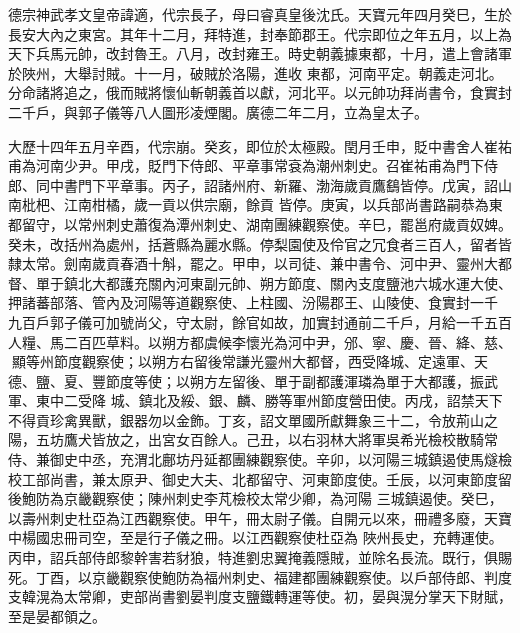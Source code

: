 
\begin{pinyinscope}

 德宗神武孝文皇帝諱適，代宗長子，母曰睿真皇後沈氏。天寶元年四月癸巳，生於長安大內之東宮。其年十二月，拜特進，封奉節郡王。代宗即位之年五月，以上為天下兵馬元帥，改封魯王。八月，改封雍王。時史朝義據東都，十月，遣上會諸軍於陜州，大舉討賊。十一月，破賊於洛陽，進收
 東都，河南平定。朝義走河北。分命諸將追之，俄而賊將懷仙斬朝義首以獻，河北平。以元帥功拜尚書令，食實封二千戶，與郭子儀等八人圖形凌煙閣。廣德二年二月，立為皇太子。



 大歷十四年五月辛酉，代宗崩。癸亥，即位於太極殿。閏月壬申，貶中書舍人崔祐甫為河南少尹。甲戌，貶門下侍郎、平章事常袞為潮州刺史。召崔祐甫為門下侍郎、同中書門下平章事。丙子，詔諸州府、新羅、渤海歲貢鷹鷂皆停。戊寅，詔山南枇杷、江南柑橘，歲一貢以供宗廟，餘貢
 皆停。庚寅，以兵部尚書路嗣恭為東都留守，以常州刺史蕭復為潭州刺史、湖南團練觀察使。辛巳，罷邕府歲貢奴婢。癸未，改括州為處州，括蒼縣為麗水縣。停梨園使及伶官之冗食者三百人，留者皆隸太常。劍南歲貢春酒十斛，罷之。甲申，以司徒、兼中書令、河中尹、靈州大都督、單于鎮北大都護充關內河東副元帥、朔方節度、關內支度鹽池六城水運大使、押諸蕃部落、管內及河陽等道觀察使、上柱國、汾陽郡王、山陵使、食實封一千
 九百戶郭子儀可加號尚父，守太尉，餘官如故，加實封通前二千戶，月給一千五百人糧、馬二百匹草料。以朔方都虞候李懷光為河中尹，邠、寧、慶、晉、絳、慈、顯等州節度觀察使；以朔方右留後常謙光靈州大都督，西受降城、定遠軍、天德、鹽、夏、豐節度等使；以朔方左留後、單于副都護渾璘為單于大都護，振武軍、東中二受降
 城、鎮北及綏、銀、麟、勝等軍州節度營田使。丙戌，詔禁天下不得貢珍禽異獸，銀器勿以金飾。丁亥，詔文單國所獻舞象三十二，令放荊山之陽，五坊鷹犬皆放之，出宮女百餘人。己丑，以右羽林大將軍吳希光檢校散騎常侍、兼御史中丞，充渭北鄜坊丹延都團練觀察使。辛卯，以河陽三城鎮遏使馬燧檢校工部尚書，兼太原尹、御史大夫、北都留守、河東節度使。壬辰，以河東節度留後鮑防為京畿觀察使；陳州刺史李芃檢校太常少卿，為河陽
 三城鎮遏使。癸巳，以壽州刺史杜亞為江西觀察使。甲午，冊太尉子儀。自開元以來，冊禮多廢，天寶中楊國忠冊司空，至是行子儀之冊。以江西觀察使杜亞為
 陜州長史，充轉運使。丙申，詔兵部侍郎黎幹害若豺狼，特進劉忠翼掩義隱賊，並除名長流。既行，俱賜死。丁酉，以京畿觀察使鮑防為福州刺史、福建都團練觀察使。以戶部侍郎、判度支韓滉為太常卿，吏部尚書劉晏判度支鹽鐵轉運等使。初，晏與滉分掌天下財賦，至是晏都領之。




\end{pinyinscope}
